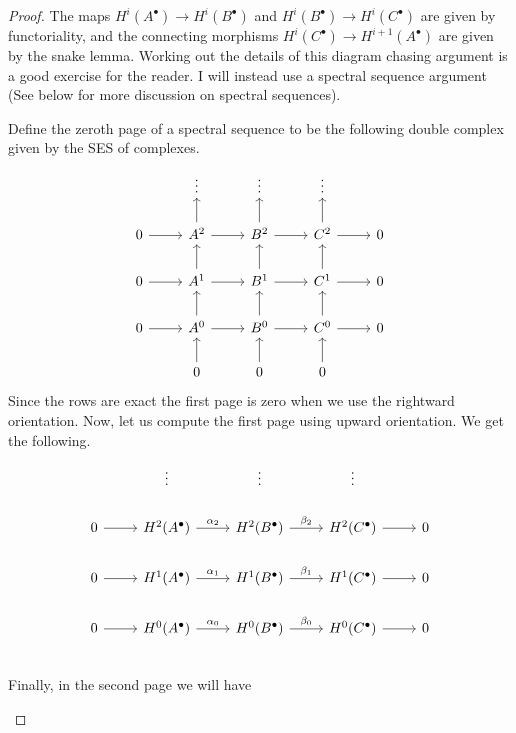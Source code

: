 \begin{proof}
  The maps $H^{i}(A^{\bullet})\to H^{i}(B^{\bullet})$ and $H^{i}(B^{\bullet})
  \to H^{i}(C^{\bullet})$ are given by functoriality, and the connecting
  morphisms $H^{i}(C^{\bullet})\to H^{i+1}(A^{\bullet})$ are given by the
  snake lemma. Working out the details of this diagram chasing argument
  is a good exercise for the reader. I will instead use a spectral sequence
  argument (See below for more discussion on spectral sequences).

  Define the zeroth page of a spectral sequence to be the following
  double complex given by the SES of complexes.
  \[\begin{tikzcd}
      & \vdots & \vdots & \vdots & \\
      0\rar & A^{2}\rar\uar & B^{2}\rar\uar & C^{2}\rar\uar & 0 \\
      0\rar & A^{1}\rar\uar & B^{1}\rar\uar & C^{1}\rar\uar & 0 \\
      0\rar & A^{0}\rar\uar & B^{0}\rar\uar & C^{0}\rar\uar & 0 \\
      & 0\uar & 0\uar & 0\uar &
    \end{tikzcd}\]
  Since the rows are exact the first page is zero when we use the rightward
  orientation. Now, let us compute the first page using upward orientation.
  We get the following.
  \[\begin{tikzcd}
      & \vdots & \vdots & \vdots & \\
      0\rar & H^{2}(A^{\bullet})\rar{\alpha_{2}}
      & H^{2}(B^{\bullet})\rar{\beta_{2}} & H^{2}(C^{\bullet})\rar & 0 \\
      0\rar & H^{1}(A^{\bullet})\rar{\alpha_{1}}
      & H^{1}(B^{\bullet})\rar{\beta_{1}} & H^{1}(C^{\bullet})\rar & 0 \\
      0\rar & H^{0}(A^{\bullet})\rar{\alpha_{0}}
      & H^{0}(B^{\bullet})\rar{\beta_{0}} & H^{0}(C^{\bullet})\rar & 0 \\
    \end{tikzcd}\]
  Finally, in the second page we will have

  \begin{center}
\end{center}
\end{proof}
